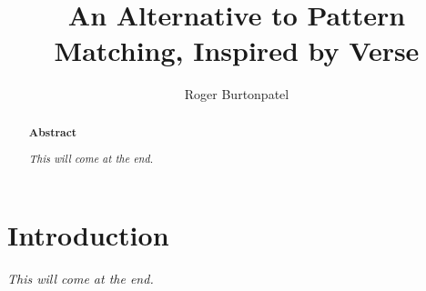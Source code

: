 \documentclass[manuscript,screen,review, 12pt]{acmart}
\begin{document}
\title{An Alternative to Pattern Matching, Inspired by Verse}

\author{Roger Burtonpatel}



\renewcommand{\shortauthors}{Burtonpatel et al.}

\begin{abstract}
    \bf{Abstract}

    \it{This will come at the end.}
  


  \end{abstract}

\maketitle

\section{Introduction}
\it{This will come at the end.}
\end{document}
